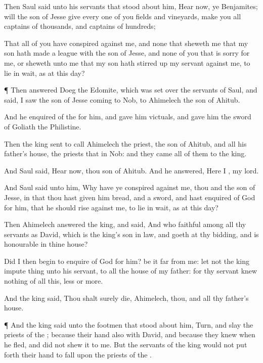 {Then
Saul
said unto his
servants that
stood about him, Hear
now, ye
Benjamites; will the
son of
Jesse
give every one of you
fields and
vineyards,
{}
make you all
captains of
thousands, and
captains of
hundreds;

That all of you have
conspired against me, and
{} none that
sheweth me that my
son hath made a
league with the
son of
Jesse, and
{} none of you that is
sorry for me, or
sheweth unto me that my
son hath stirred
up my
servant against me, to lie in
wait, as at this
day?


\par }{\PP {}¶ Then
answered
Doeg the
Edomite, which was
set over the
servants of
Saul, and
said, I
saw the
son of
Jesse
coming to
Nob, to
Ahimelech the
son of
Ahitub.

And he
enquired of the
{} for him, and
gave him
victuals, and
gave him the
sword of
Goliath the
Philistine.

Then the
king
sent to
call
Ahimelech the
priest, the
son of
Ahitub, and all his
father’s
house, the
priests that
{} in
Nob: and they
came all of them to the
king.

And
Saul
said,
Hear now, thou
son of
Ahitub. And he
answered, Here I
{}, my
lord.

And
Saul
said unto him, Why have ye
conspired against me, thou and the
son of
Jesse, in that thou hast
given him
bread, and a
sword, and hast
enquired of
God for him, that he should
rise against me, to lie in
wait, as at this
day?

Then
Ahimelech
answered the
king, and
said, And who
{}
faithful among all thy
servants as
David, which is the
king’s son in
law, and
goeth at thy
bidding, and is
honourable in thine
house?

Did I
then
begin to
enquire of
God for him? be it far from
me: let not the
king
impute
{}
thing unto his
servant,
{} to all the
house of my
father: for thy
servant
knew
nothing of all this,
less or
more.

And the
king
said, Thou shalt
surely
die,
Ahimelech, thou, and all thy
father’s
house.


\par }{\PP {}¶ And the
king
said unto the
footmen that
stood about him,
Turn, and
slay the
priests of the
{}; because their
hand also
{} with
David, and because they
knew when he
fled, and did not
shew it to me. But the
servants of the
king
would not put
forth their
hand to
fall upon the
priests of the
{}.

}
